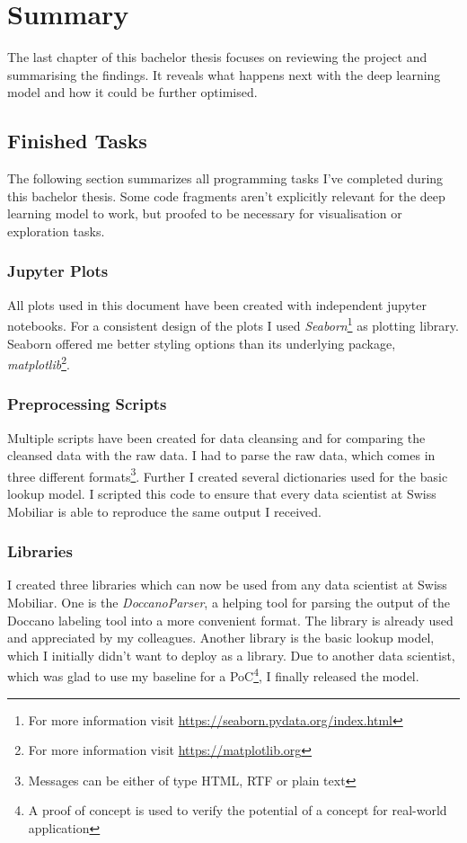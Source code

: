 \chapter{Summary}

The last chapter of this bachelor thesis focuses on reviewing the project and summarising the findings. It reveals what happens next with the deep learning model and how it could be further optimised.

\section{Finished Tasks}

The following section summarizes all programming tasks I've completed during this bachelor thesis. Some code fragments aren't explicitly relevant for the deep learning model to work, but proofed to be necessary for visualisation or exploration tasks.

\subsection{Jupyter Plots}

All plots used in this document have been created with independent jupyter notebooks. For a consistent design of the plots I used \emph{Seaborn}\footnote{For more information visit \url{https://seaborn.pydata.org/index.html}} as plotting library. Seaborn offered me better styling options than its underlying package, \emph{matplotlib}\footnote{For more information visit \url{https://matplotlib.org}}.

\subsection{Preprocessing Scripts}

Multiple scripts have been created for data cleansing and for comparing the cleansed data with the raw data. I had to parse the raw data, which comes in three different formats\footnote{Messages can be either of type HTML, RTF or plain text}. Further I created several dictionaries used for the basic lookup model. I scripted this code to ensure that every data scientist at Swiss Mobiliar is able to reproduce the same output I received.

\subsection{Libraries}

I created three libraries which can now be used from any data scientist at Swiss Mobiliar. One is the \emph{DoccanoParser}, a helping tool for parsing the output of the Doccano labeling tool into a more convenient format. The library is already used and appreciated by my colleagues. Another library is the basic lookup model, which I initially didn't want to deploy as a library. Due to another data scientist, which was glad to use my baseline for a PoC\footnote{A proof of concept is used to verify the potential of a concept for real-world application}, I finally released the model.

